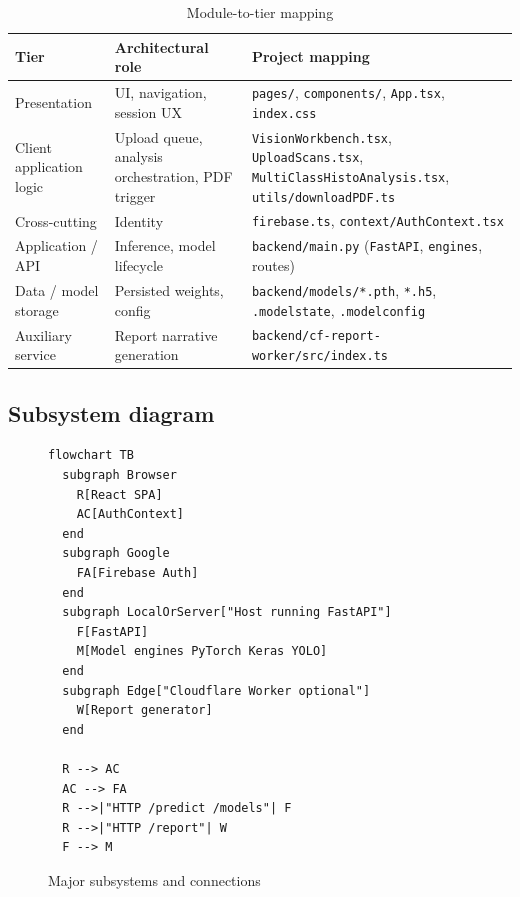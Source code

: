 \begin{table}[htbp]
  \centering
  \caption{Module-to-tier mapping}
  \begin{tabular}{@{}p{}p{}p{}@{}}
    \toprule
    \textbf{Tier} & \textbf{Architectural role} & \textbf{Project mapping} \\
    \midrule
    Presentation & UI, navigation, session UX & \texttt{pages/}, \texttt{components/}, \texttt{App.tsx}, \texttt{index.css} \\
    Client application logic & Upload queue, analysis orchestration, PDF trigger & \texttt{VisionWorkbench.tsx}, \texttt{UploadScans.tsx}, \texttt{MultiClassHistoAnalysis.tsx}, \texttt{utils/downloadPDF.ts} \\
    Cross-cutting & Identity & \texttt{firebase.ts}, \texttt{context/AuthContext.tsx} \\
    Application / API & Inference, model lifecycle & \texttt{backend/main.py} (\texttt{FastAPI}, \texttt{engines}, routes) \\
    Data / model storage & Persisted weights, config & \texttt{backend/models/*.pth}, \texttt{*.h5}, \texttt{.modelstate}, \texttt{.modelconfig} \\
    Auxiliary service & Report narrative generation & \texttt{backend/cf-report-worker/src/index.ts} \\
    \bottomrule
  \end{tabular}
\end{table}

\subsection{Subsystem diagram}

\begin{figure}[htbp]
  \centering
  \begin{minipage}{0.92\textwidth}
  \begin{lstlisting}
flowchart TB
  subgraph Browser
    R[React SPA]
    AC[AuthContext]
  end
  subgraph Google
    FA[Firebase Auth]
  end
  subgraph LocalOrServer["Host running FastAPI"]
    F[FastAPI]
    M[Model engines PyTorch Keras YOLO]
  end
  subgraph Edge["Cloudflare Worker optional"]
    W[Report generator]
  end

  R --> AC
  AC --> FA
  R -->|"HTTP /predict /models"| F
  R -->|"HTTP /report"| W
  F --> M
  \end{lstlisting}
  \end{minipage}
  \caption{Major subsystems and connections}
\end{figure}


